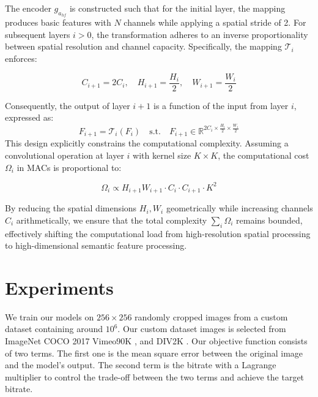 \documentclass{article}
\begin{document}
The encoder $g_{a_{hf}}$ is constructed such that for the initial layer, the mapping produces basic features with $N$ channels while applying a spatial stride of 2. For subsequent layers $i > 0$, the transformation adheres to an inverse proportionality between spatial resolution and channel capacity. Specifically, the mapping $\mathcal{T}_i$ enforces:

\begin{equation}
C_{i+1} = 2C_i, \quad H_{i+1} = \frac{H_i}{2}, \quad W_{i+1} = \frac{W_i}{2}
\end{equation}

Consequently, the output of layer $i+1$ is a function of the input from layer $i$, expressed as:
\begin{equation}
F_{i+1} = \mathcal{T}_i(F_i) \quad \text{s.t.} \quad F_{i+1} \in \mathbb{R}^{2C_i \times \frac{H_i}{2} \times \frac{W_i}{2}}
\end{equation}
This design explicitly constrains the computational complexity. Assuming a convolutional operation at layer $i$ with kernel size $K \times K$, the computational cost $\Omega_i$ in MACs is proportional to:

\begin{equation}
\Omega_i \propto H_{i+1} W_{i+1} \cdot C_i \cdot C_{i+1} \cdot K^2
\end{equation}

By reducing the spatial dimensions $H_i, W_i$ geometrically while increasing channels $C_i$ arithmetically, we ensure that the total complexity $\sum_i \Omega_i$ remains bounded, effectively shifting the computational load from high-resolution spatial processing to high-dimensional semantic feature processing.
\section{Experiments}
 We train our models on $256 \times 256$ randomly cropped images from a custom dataset containing around $10^6$. Our custom dataset images is selected from ImageNet \cite{dengImageNetLargescaleHierarchical2009a}
COCO 2017 \cite{linMicrosoftCOCOCommon2015} Vimeo90K \cite{xueVideoEnhancementTaskOriented2019}, and
DIV2K \cite{agustssonNTIRE2017Challenge2017}. Our objective function consists of two terms. The first one is the mean square error between the original image and the model's output. The second term is the bitrate with a Lagrange multiplier to control the trade-off between the two terms and achieve the target bitrate.
\end{document}
